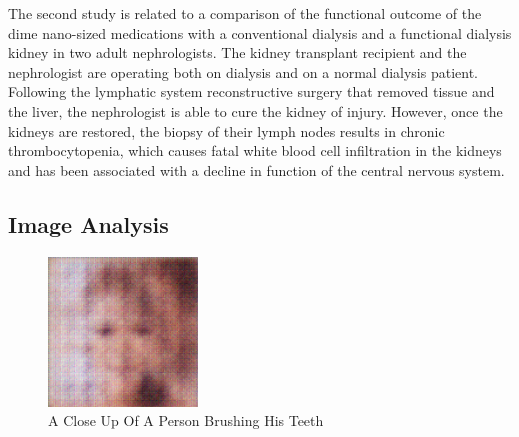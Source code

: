 \documentclass{article}%
\begin{document}
The second study is related to a comparison of the functional outcome of the dime nano{-}sized medications with a conventional dialysis and a functional dialysis kidney in two adult nephrologists. The kidney transplant recipient and the nephrologist are operating both on dialysis and on a normal dialysis patient. Following the lymphatic system reconstructive surgery that removed tissue and the liver, the nephrologist is able to cure the kidney of injury. However, once the kidneys are restored, the biopsy of their lymph nodes results in chronic thrombocytopenia, which causes fatal white blood cell infiltration in the kidneys and has been associated with a decline in function of the central nervous system.

%
\subsection{Image Analysis}%
\label{subsec:ImageAnalysis}%


\begin{figure}[h!]%
\centering%
\includegraphics[width=150px]{500_fake_images/samples_5_59.png}%
\caption{A Close Up Of A Person Brushing His Teeth}%
\end{figure}

%
\end{document}
